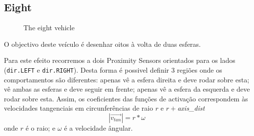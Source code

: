 \documentclass[a4paper]{article}
\begin{document}
\subsection{Eight}
\begin{figure}[h]
	\centering

	
	\caption{The eight vehicle}
\end{figure}
\indent O objectivo deste veículo é desenhar oitos à volta de duas esferas.

\indent Para este efeito recorremos a dois Proximity Sensors orientados para os lados (\texttt{dir.LEFT} e \texttt{dir.RIGHT}).
Desta forma é possivel definir 3 regiões onde os comportamentos são diferentes: apenas vê a esfera direita e deve rodar sobre esta; vê ambas as esferas e deve seguir em frente; apenas vê a esfera da esquerda e deve rodar sobre esta.
Assim, os coeficientes das funções de activação correspondem às velocidades tangenciais em circunferências de raio $r$ e $r+$\emph{axis\_dist}
\[
	|\vec{v_{tan}}| = r * \omega 
\]
onde $r$ é o raio; e $\omega$ é a velocidade ângular.
\end{document}
